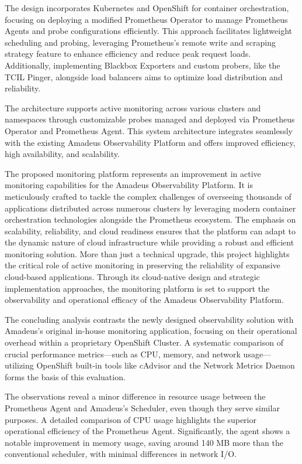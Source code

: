 The design incorporates Kubernetes and OpenShift for container orchestration, focusing on deploying a modified Prometheus Operator to manage Prometheus Agents and probe configurations efficiently. This approach facilitates lightweight scheduling and probing, leveraging Prometheus's remote write and scraping strategy feature to enhance efficiency and reduce peak request loads. Additionally, implementing Blackbox Exporters and custom probers, like the \ac{TCIL} Pinger, alongside load balancers aims to optimize load distribution and reliability. 

The architecture supports active monitoring across various clusters and namespaces through customizable probes managed and deployed via Prometheus Operator and Prometheus Agent. This system architecture integrates seamlessly with the existing Amadeus Observability Platform and offers improved efficiency, high availability, and scalability. 

The proposed monitoring platform represents an improvement in active monitoring capabilities for the Amadeus Observability Platform. It is meticulously crafted to tackle the complex challenges of overseeing thousands of applications distributed across numerous clusters by leveraging modern container orchestration technologies alongside the Prometheus ecosystem. The emphasis on scalability, reliability, and cloud readiness ensures that the platform can adapt to the dynamic nature of cloud infrastructure while providing a robust and efficient monitoring solution. More than just a technical upgrade, this project highlights the critical role of active monitoring in preserving the reliability of expansive cloud-based applications. Through its cloud-native design and strategic implementation approaches, the monitoring platform is set to support the observability and operational efficacy of the Amadeus Observability Platform. 

The concluding analysis contrasts the newly designed observability solution with Amadeus's original in-house monitoring application, focusing on their operational overhead within a proprietary OpenShift Cluster. A systematic comparison of crucial performance metrics—such as \ac{CPU}, memory, and network usage—utilizing OpenShift built-in tools like cAdvisor and the Network Metrics Daemon forms the basis of this evaluation. 

The observations reveal a minor difference in resource usage between the Prometheus Agent and Amadeus's Scheduler, even though they serve similar purposes. A detailed comparison of \ac{CPU} usage highlights the superior operational efficiency of the Prometheus Agent. Significantly, the agent shows a notable improvement in memory usage, saving around 140 MB more than the conventional scheduler, with minimal differences in network I/O. 


